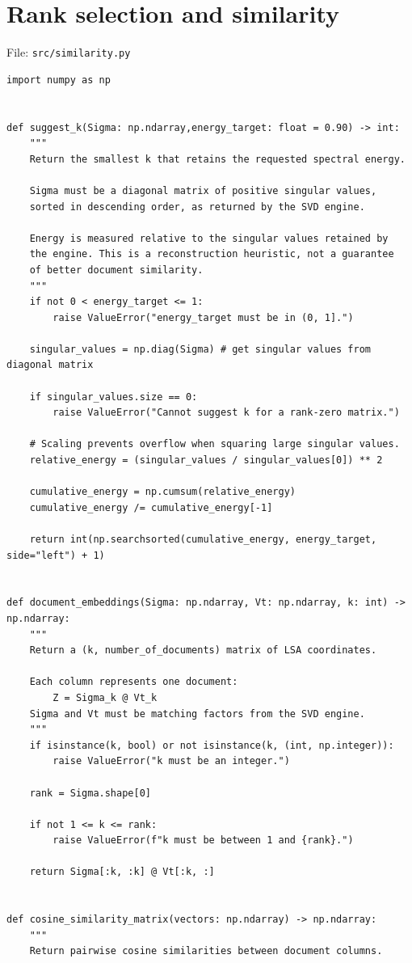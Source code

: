 \documentclass[12pt,a4paper]{report}
\theoremstyle{plain}
\theoremstyle{definition}
\theoremstyle{remark}
\theoremstyle{definition}
\begin{document}
\section{Rank selection and similarity}
\noindent File: \texttt{src/similarity.py}
\begin{lstlisting}
import numpy as np


def suggest_k(Sigma: np.ndarray,energy_target: float = 0.90) -> int:
    """
    Return the smallest k that retains the requested spectral energy.

    Sigma must be a diagonal matrix of positive singular values,
    sorted in descending order, as returned by the SVD engine.

    Energy is measured relative to the singular values retained by
    the engine. This is a reconstruction heuristic, not a guarantee
    of better document similarity.
    """
    if not 0 < energy_target <= 1:
        raise ValueError("energy_target must be in (0, 1].")

    singular_values = np.diag(Sigma) # get singular values from diagonal matrix

    if singular_values.size == 0:
        raise ValueError("Cannot suggest k for a rank-zero matrix.")

    # Scaling prevents overflow when squaring large singular values.
    relative_energy = (singular_values / singular_values[0]) ** 2

    cumulative_energy = np.cumsum(relative_energy)
    cumulative_energy /= cumulative_energy[-1]

    return int(np.searchsorted(cumulative_energy, energy_target, side="left") + 1)


def document_embeddings(Sigma: np.ndarray, Vt: np.ndarray, k: int) -> np.ndarray:
    """
    Return a (k, number_of_documents) matrix of LSA coordinates.

    Each column represents one document:
        Z = Sigma_k @ Vt_k
    Sigma and Vt must be matching factors from the SVD engine.
    """
    if isinstance(k, bool) or not isinstance(k, (int, np.integer)):
        raise ValueError("k must be an integer.")

    rank = Sigma.shape[0]

    if not 1 <= k <= rank:
        raise ValueError(f"k must be between 1 and {rank}.")

    return Sigma[:k, :k] @ Vt[:k, :]


def cosine_similarity_matrix(vectors: np.ndarray) -> np.ndarray:
    """
    Return pairwise cosine similarities between document columns.


\end{lstlisting}
\end{document}
